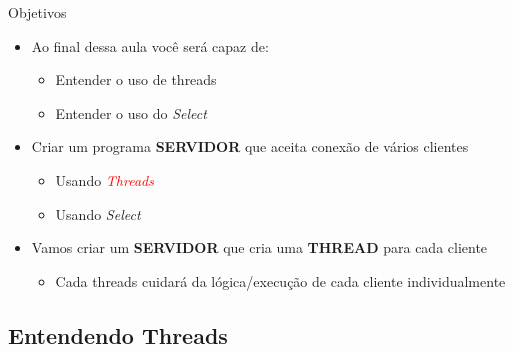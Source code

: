 \documentclass[10pt, xcolor=x11names]{beamer}
\begin{document}
\begin{frame}
	\begin{block}{Objetivos}
		\begin{itemize}
			\item Ao final dessa aula você será capaz de:
			\begin{itemize}
				\item Entender o uso de threads
				\item Entender o uso do \textit{Select}
			\end{itemize}
			\item Criar um programa \textbf{SERVIDOR} que aceita conexão de vários clientes
			\begin{itemize}
				\item Usando \textcolor<2->{red}{\textit{Threads}}
				\item Usando \textit{Select}
			\end{itemize}
		\end{itemize}
		\begin{itemize}
			\item<2-> Vamos criar um \textbf{SERVIDOR} que cria uma \textbf{THREAD} para cada cliente
			\begin{itemize}
				\item Cada threads cuidará da lógica/execução de cada cliente individualmente
			\end{itemize}
		\end{itemize}
	\end{block}
\end{frame}

\subsection{Entendendo Threads} %
\end{document}
